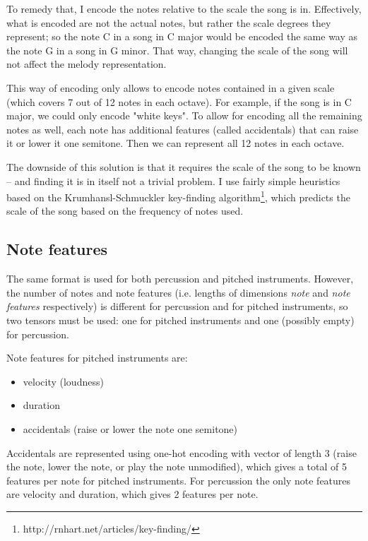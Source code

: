 \documentclass[en]{pracamgr}
\begin{document}
To remedy that, I encode the notes relative to the scale the song is in.
Effectively, what is encoded are not the actual notes, but rather the scale degrees they represent; so the note C in a song in C major would be encoded the same way as the note G in a song in G minor.
That way, changing the scale of the song will not affect the melody representation.

This way of encoding only allows to encode notes contained in a given scale (which covers 7 out of 12 notes in each octave).
For example, if the song is in C major, we could only encode "white keys".
To allow for encoding all the remaining notes as well, each note has additional features (called accidentals) that can raise it or lower it one semitone.
Then we can represent all 12 notes in each octave.

The downside of this solution is that it requires the scale of the song to be known -- and finding it is in itself not a trivial problem.
I use fairly simple heuristics based on the Krumhansl-Schmuckler key-finding algorithm\footnote{http://rnhart.net/articles/key-finding/}, which predicts the scale of the song based on the frequency of notes used.

\subsection{Note features}

The same format is used for both percussion and pitched instruments.
However, the number of notes and note features (i.e. lengths of dimensions \emph{note} and \emph{note features} respectively) is different for percussion and for pitched instruments, so two tensors must be used: one for pitched instruments and one (possibly empty) for percussion.

Note features for pitched instruments are:
\begin{itemize}
    \item velocity (loudness)
    \item duration
    \item accidentals (raise or lower the note one semitone)
\end{itemize}

Accidentals are represented using one-hot encoding with vector of length 3 (raise the note, lower the note, or play the note unmodified), which gives a total of 5 features per note for pitched instruments.
For percussion the only note features are velocity and duration, which gives 2 features per note.
\end{document}
